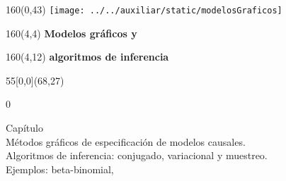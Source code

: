 \documentclass[shownotes,aspectratio=169]{beamer}
\newcounter{capitulo}
\newcommand{\unidad}{\thecapitulo \stepcounter{capitulo}}
\begin{document}
\begin{frame}
\begin{textblock}{160}(0,43)
\texttt{[image: ../../auxiliar/static/modelosGraficos]}
\end{textblock}


\begin{textblock}{160}(4,4)
\LARGE \textcolor{black!85}{\fontsize{22}{0}\selectfont \textbf{Modelos gráficos y}}
\end{textblock}
\begin{textblock}{160}(4,12)
\LARGE \textcolor{black!85}{\fontsize{22}{0}\selectfont \textbf{algoritmos de inferencia}}
\end{textblock}


\begin{textblock}{55}[0,0](68,27)
\begin{turn}{0}
\parbox{10cm}{\sloppy\setlength\parfillskip{0pt}
\textcolor{black!85}{Capítulo \unidad} \\
\small\textcolor{black!85}{Métodos gráficos de especificación de modelos causales.} \\
\small\textcolor{black!85}{Algoritmos de inferencia: conjugado, variacional y muestreo.} \\
\small\textcolor{black!85}{Ejemplos: beta-binomial, }\\
}
\end{turn}
\end{textblock}

\end{frame}
\end{document}
